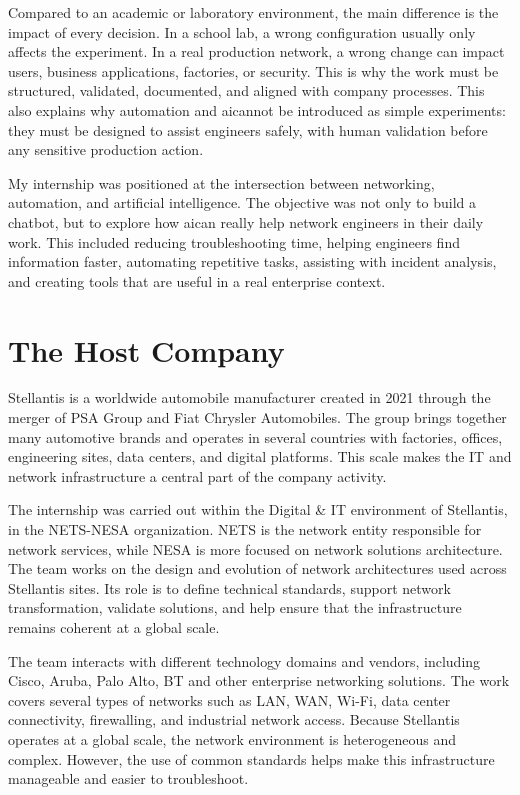 \documentclass[11pt,a4paper]{report}
\begin{document}
Compared to an academic or laboratory environment, the main difference is the impact of every decision. In a school lab, a wrong configuration usually only affects the experiment. In a real production network, a wrong change can impact users, business applications, factories, or security. This is why the work must be structured, validated, documented, and aligned with company processes. This also explains why automation and \gls{ai}cannot be introduced as simple experiments: they must be designed to assist engineers safely, with human validation before any sensitive production action.

My internship was positioned at the intersection between networking, automation, and artificial intelligence. The objective was not only to build a chatbot, but to explore how \gls{ai}can really help network engineers in their daily work. This included reducing troubleshooting time, helping engineers find information faster, automating repetitive tasks, assisting with incident analysis, and creating tools that are useful in a real enterprise context.

\section{The Host Company}

Stellantis is a worldwide automobile manufacturer created in 2021 through the merger of PSA Group and Fiat Chrysler Automobiles. The group brings together many automotive brands and operates in several countries with factories, offices, engineering sites, data centers, and digital platforms. This scale makes the IT and network infrastructure a central part of the company activity.

The internship was carried out within the Digital \& IT environment of Stellantis, in the NETS-NESA organization. NETS is the network entity responsible for network services, while NESA is more focused on network solutions architecture. The team works on the design and evolution of network architectures used across Stellantis sites. Its role is to define technical standards, support network transformation, validate solutions, and help ensure that the infrastructure remains coherent at a global scale.

The team interacts with different technology domains and vendors, including Cisco, Aruba, Palo Alto, BT and other enterprise networking solutions. The work covers several types of networks such as LAN, WAN, Wi-Fi, data center connectivity, firewalling, and industrial network access. Because Stellantis operates at a global scale, the network environment is heterogeneous and complex. However, the use of common standards helps make this infrastructure manageable and easier to troubleshoot.
\end{document}
